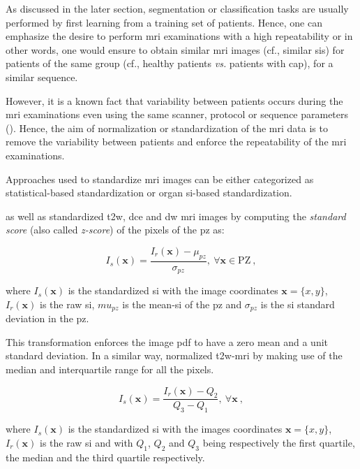 \begin{enumerate}[leftmargin=*]
As discussed in the later section, segmentation or classification tasks are usually performed by first learning from a training set of patients. Hence, one can emphasize the desire to perform \ac{mri} examinations with a high repeatability or in other words, one would ensure to obtain similar \ac{mri} images (cf., similar \acp{si}) for patients of the same group (cf., healthy patients \textit{vs.} patients with \ac{cap}), for a similar sequence.

However, it is a known fact that variability between patients occurs during the \ac{mri} examinations even using the same scanner, protocol or sequence parameters (\cite{Nyul1999}). Hence, the aim of normalization or standardization of the \ac{mri} data is to remove the variability between patients and enforce the repeatability of the \ac{mri} examinations.

Approaches used to standardize \ac{mri} images can be either categorized as statistical-based standardization or organ \ac{si}-based standardization. 

\cite{Artan2009,Artan2010} as well as \cite{Ozer2009,Ozer2010} standardized \ac{t2w}, \ac{dce} and \ac{dw} \ac{mri} images by computing the \textit{standard score} (also called \textit{z-score}) of the pixels of the \ac{pz} as:

\begin{equation}
	I_s(\mathbf{x}) = \frac{ I_r(\mathbf{x}) - \mu_{pz}}{\sigma_{pz}}, \ \forall \mathbf{x} \in \text{PZ} \ ,
	\label{eq:meansta}
\end{equation}

\noindent where $I_s(\mathbf{x})$ is the standardized \ac{si} with the image coordinates $\mathbf{x} = \{x,y\}$, $I_r(\mathbf{x})$ is the raw \ac{si}, $mu_{pz}$ is the mean-\ac{si} of the \ac{pz} and $\sigma_{pz}$ is the \ac{si} standard deviation in the \ac{pz}.

This transformation enforces the image \ac{pdf} to have a zero mean and a unit standard deviation. In a similar way, \cite{Liu2013} normalized \ac{t2w}-\ac{mri} by making use of the median and interquartile range for all the pixels.

\begin{equation}
	I_s(\mathbf{x}) = \frac{ I_r(\mathbf{x}) - Q_2}{Q_3 - Q_1}, \ \forall \mathbf{x} \ ,
	\label{eq:medsta}
\end{equation}

\noindent where $I_s(\mathbf{x})$ is the standardized \ac{si} with the images coordinates $\mathbf{x} = \{x,y\}$, $I_r(\mathbf{x})$ is the raw \ac{si} and with $Q_1$, $Q_2$ and $Q_3$ being respectively the first quartile, the median and the third quartile respectively.


\end{enumerate}

